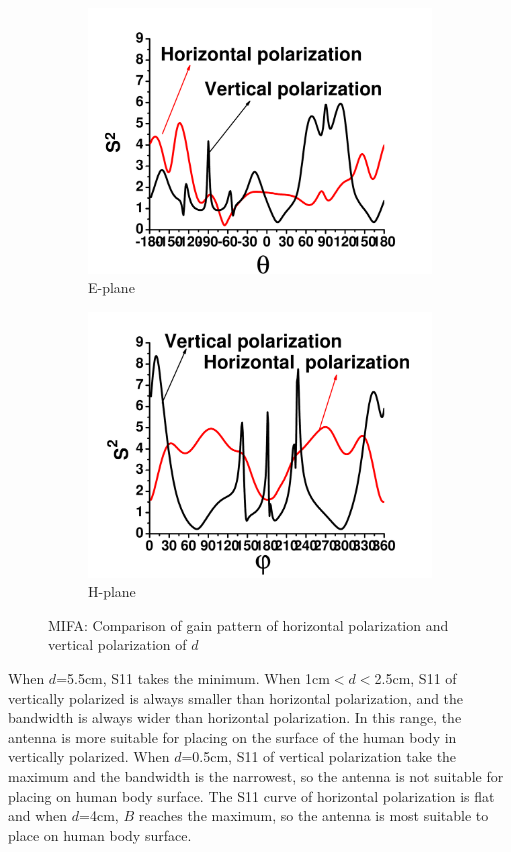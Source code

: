 \documentclass[journal]{IEEEtran}
\begin{document}
\begin{figure}[!htb]
\begin{subfigure}[b]{0.24\textwidth}
\includegraphics[width=\textwidth]{figs/9e.pdf}
\caption{E-plane}
\label{fig:9c}	
\end{subfigure}
\begin{subfigure}[b]{0.24\textwidth}
\includegraphics[width=\textwidth]{figs/9f.pdf}
\caption{H-plane}
\label{fig:9f}	
\end{subfigure}
\caption{MIFA: Comparison of gain pattern of horizontal polarization and vertical polarization of $d$}
\label{fig:9}
\end{figure}
When $d$=5.5cm, S11 takes the minimum. When 1cm$<$$d$$<$2.5cm, S11 of vertically polarized is always smaller than
horizontal polarization, and the bandwidth is always wider than horizontal polarization. In this range, the antenna is more
suitable for placing on the surface of the human body in vertically polarized. When $d$=0.5cm, S11 of vertical
polarization take the maximum and the bandwidth is the narrowest, so the antenna is not suitable for placing on human body
surface. The S11 curve of horizontal polarization is flat and when $d$=4cm, $B$ reaches the maximum, so the
antenna is most suitable to place on human body surface.
\end{document}
